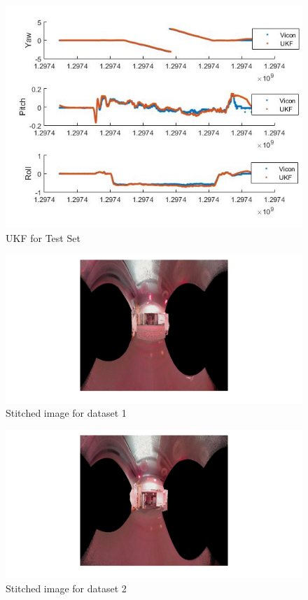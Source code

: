\documentclass[fleqn,10pt]{SelfArx} %
\begin{document}
\begin{figure}[hbtp]
\centering
\includegraphics[scale=0.45]{10.jpg}
\caption{UKF for Test Set}
\label{fig:10}
\end{figure}

\begin{figure}
\centering
\includegraphics[trim={18cm 0cm 14cm 0cm},scale = 0.55]{pan1.jpg}
\caption{Stitched image for dataset 1}
\label{fig:pan1}
\end{figure}

\begin{figure}
\centering
\includegraphics[trim={18cm 0cm 14cm 0cm},scale = 0.55]{pan2.jpg}
\caption{Stitched image for dataset 2}
\label{fig:pan2}
\end{figure}
\end{document}
